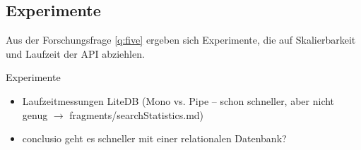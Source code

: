 \subsection{Experimente} \label{sec:Experimente}
    Aus der Forschungsfrage \ref{q:five} ergeben sich Experimente, die auf Skalierbarkeit und Laufzeit der API abziehlen.
    
    
    
    Experimente
    \begin{itemize}
        \item Laufzeitmessungen LiteDB (Mono vs. Pipe -- schon schneller, aber nicht genug $\rightarrow$ fragments/searchStatistics.md)
        \item conclusio geht es schneller mit einer relationalen Datenbank?
    \end{itemize}
